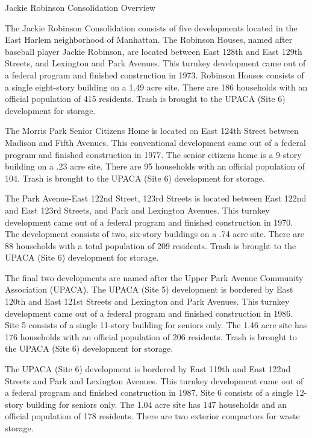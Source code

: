 Jackie Robinson Consolidation Overview

The Jackie Robinson Consolidation consists of five developments located in the East Harlem neighborhood of Manhattan. The Robinson Houses, named after baseball player Jackie Robinson, are located between East 128th and East 129th Streets, and Lexington and Park Avenues. This turnkey development came out of a federal program and finished construction in 1973. Robinson Houses consists of a single eight-story building on a 1.49 acre site. There are 186 households with an official population of 415 residents. Trash is brought to the UPACA (Site 6) development for storage. 

The Morris Park Senior Citizens Home is located on East 124th Street between Madison and Fifth Avenues. This conventional development came out of a federal program and finished construction in 1977. The senior citizens home is a 9-story building on a .23 acre site. There are 95 households with an official population of 104. Trash is brought to the UPACA (Site 6) development for storage.

The Park Avenue-East 122nd Street, 123rd Streets is located between East 122nd and East 123rd Streets, and Park and Lexington Avenues. This turnkey development came out of a federal program and finished construction in 1970. The development consists of two, six-story buildings on a .74 acre site. There are 88 households with a total population of 209 residents. Trash is brought to the UPACA (Site 6) development for storage.

The final two developments are named after the Upper Park Avenue Community Association (UPACA). The UPACA (Site 5) development is bordered by East 120th and East 121st Streets and Lexington and Park Avenues. This turnkey development came out of a federal program and finished construction in 1986. Site 5 consists of a single 11-story building for seniors only. The 1.46 acre site has 176 households with an official population of 206 residents. Trash is brought to the UPACA (Site 6) development for storage.

The UPACA (Site 6) development is bordered by East 119th and East 122nd Streets and Park and Lexington Avenues. This turnkey development came out of a federal program and finished construction in 1987. Site 6 consists of a single 12-story building for seniors only. The 1.04 acre site has 147 households and an official population of 178 residents. There are two exterior compactors for waste storage.